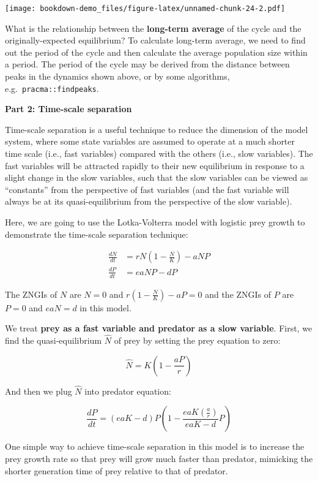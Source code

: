 \documentclass[
]{book}
\begin{document}
\texttt{[image: bookdown-demo\_files/figure-latex/unnamed-chunk-24-2.pdf]}

What is the relationship between the \textbf{long-term average} of the cycle and the originally-expected equilibrium? To calculate long-term average, we need to find out the period of the cycle and then calculate the average population size within a period. The period of the cycle may be derived from the distance between peaks in the dynamics shown above, or by some algorithms, e.g.~\texttt{pracma::findpeaks}.

\textbf{Part 2: Time-scale separation}

Time-scale separation is a useful technique to reduce the dimension of the model system, where some state variables are assumed to operate at a much shorter time scale (i.e., fast variables) compared with the others (i.e., slow variables). The fast variables will be attracted rapidly to their new equilibrium in response to a slight change in the slow variables, such that the slow variables can be viewed as ``constants'' from the perspective of fast variables (and the fast variable will always be at its quasi-equilibrium from the perspective of the slow variable).

Here, we are going to use the Lotka-Volterra model with logistic prey growth to demonstrate the time-scale separation technique:

\begin{align*}
\frac {dN}{dt} &= rN(1-\frac{N}{K})-aNP\\
\frac {dP}{dt} &= eaNP-dP
\end{align*}

The ZNGIs of \(N\) are \(N = 0\) and \(r(1-\frac{N}{K}) - aP = 0\) and the ZNGIs of \(P\) are \(P = 0\) and \(eaN = d\) in this model.

We treat \textbf{prey as a fast variable and predator as a slow variable}. First, we find the quasi-equilibrium \(\widehat{N}\) of prey by setting the prey equation to zero:

\[\widehat{N} = K(1-\frac{aP}{r})\]

And then we plug \(\widehat{N}\) into predator equation:

\[\frac {dP}{dt} = (eaK-d)P(1-\frac{eaK(\frac{a}{r})}{eaK-d}P)\]

One simple way to achieve time-scale separation in this model is to increase the prey growth rate so that prey will grow much faster than predator, mimicking the shorter generation time of prey relative to that of predator.
\end{document}
